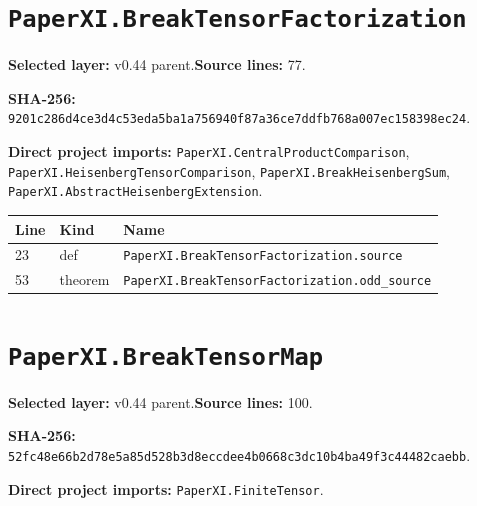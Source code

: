 \documentclass[10pt,oneside]{book}
\begin{document}
\section{\texorpdfstring{\nolinkurl{PaperXI.BreakTensorFactorization}}{PaperXI.BreakTensorFactorization}}\label{module:PaperXI.BreakTensorFactorization}

\textbf{Selected layer:} v0.44 parent.\quad\textbf{Source lines:} 77.\par\textbf{SHA-256:} {\scriptsize\nolinkurl{9201c286d4ce3d4c53eda5ba1a756940f87a36ce7ddfb768a007ec158398ec24}}.


\textbf{Direct project imports:} \nolinkurl{PaperXI.CentralProductComparison}, \nolinkurl{PaperXI.HeisenbergTensorComparison}, \nolinkurl{PaperXI.BreakHeisenbergSum}, \nolinkurl{PaperXI.AbstractHeisenbergExtension}.

\begin{longtable}{@{}p{}p{}p{}@{}}\toprule Line&Kind&Name\\\midrule\endhead

23&def&\nolinkurl{PaperXI.BreakTensorFactorization.source}\\

53&theorem&\nolinkurl{PaperXI.BreakTensorFactorization.odd_source}\\

\bottomrule\end{longtable}

\section{\texorpdfstring{\nolinkurl{PaperXI.BreakTensorMap}}{PaperXI.BreakTensorMap}}\label{module:PaperXI.BreakTensorMap}

\textbf{Selected layer:} v0.44 parent.\quad\textbf{Source lines:} 100.\par\textbf{SHA-256:} {\scriptsize\nolinkurl{52fc48e66b2d78e5a85d528b3d8eccdee4b0668c3dc10b4ba49f3c44482caebb}}.


\textbf{Direct project imports:} \nolinkurl{PaperXI.FiniteTensor}.
\end{document}
